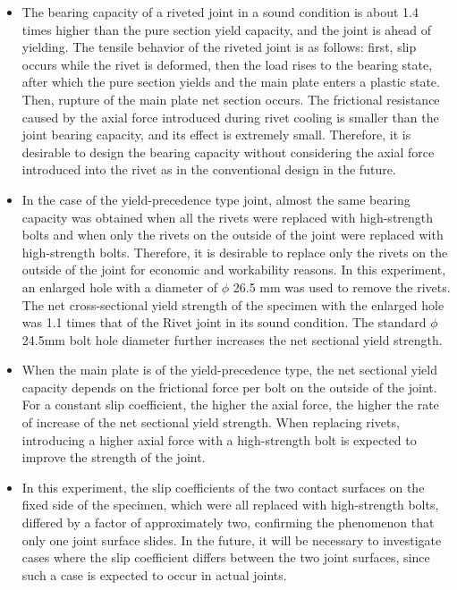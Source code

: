 \begin{itemize}
    \item The bearing capacity of a riveted joint in a sound condition is about 1.4 times higher than the pure section yield capacity, and the joint is ahead of yielding. The tensile behavior of the riveted joint is as follows: first, slip occurs while the rivet is deformed, then the load rises to the bearing state, after which the pure section yields and the main plate enters a plastic state. Then, rupture of the main plate net section occurs. The frictional resistance caused by the axial force introduced during rivet cooling is smaller than the joint bearing capacity, and its effect is extremely small. Therefore, it is desirable to design the bearing capacity without considering the axial force introduced into the rivet as in the conventional design in the future.
    
    \item In the case of the yield-precedence type joint, almost the same bearing capacity was obtained when all the rivets were replaced with high-strength bolts and when only the rivets on the outside of the joint were replaced with high-strength bolts. Therefore, it is desirable to replace only the rivets on the outside of the joint for economic and workability reasons. In this experiment, an enlarged hole with a diameter of $\phi$ 26.5 mm was used to remove the rivets. The net cross-sectional yield strength of the specimen with the enlarged hole was 1.1 times that of the Rivet joint in its sound condition. The standard $\phi$ 24.5mm bolt hole diameter further increases the net sectional yield strength.
    
    \item When the main plate is of the yield-precedence type, the net sectional yield capacity depends on the frictional force per bolt on the outside of the joint. For a constant slip coefficient, the higher the axial force, the higher the rate of increase of the net sectional yield strength. When replacing rivets, introducing a higher axial force with a high-strength bolt is expected to improve the strength of the joint.
    
    \item In this experiment, the slip coefficients of the two contact surfaces on the fixed side of the specimen, which were all replaced with high-strength bolts, differed by a factor of approximately two, confirming the phenomenon that only one joint surface slides. In the future, it will be necessary to investigate cases where the slip coefficient differs between the two joint surfaces, since such a case is expected to occur in actual joints.
\end{itemize}
